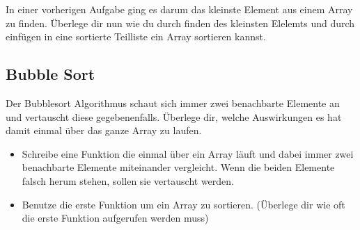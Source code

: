 \documentclass[c_worksheet.tex]{subfiles}
\begin{document}
In einer vorherigen Aufgabe ging es darum das kleinste Element aus einem Array zu finden. Überlege dir nun wie du durch finden des kleinsten Elelemts und durch einfügen in eine sortierte Teilliste ein Array sortieren kannst.

\subsection{Bubble Sort}

Der Bubblesort Algorithmus schaut sich immer zwei benachbarte Elemente an und vertauscht diese gegebenenfalls. Überlege dir, welche Auswirkungen es hat damit einmal über das ganze Array zu laufen.

\begin{itemize}
  \item Schreibe eine Funktion die einmal über ein Array läuft und dabei immer zwei benachbarte Elemente miteinander vergleicht. Wenn die beiden Elemente falsch herum stehen, sollen sie vertauscht werden.
  \item Benutze die erste Funktion um ein Array zu sortieren. (Überlege dir wie oft die erste Funktion aufgerufen werden muss)
\end{itemize}
\end{document}
